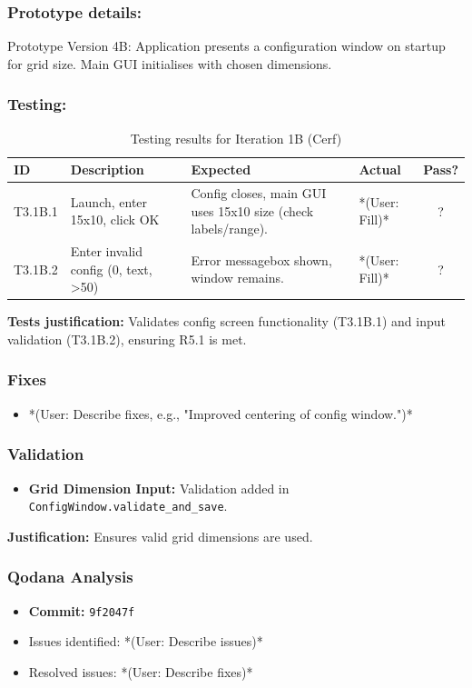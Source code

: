 \subsubsection{Prototype details:}
Prototype Version 4B: Application presents a configuration window on startup for grid size. Main GUI initialises with chosen dimensions.

\subsubsection{Testing:}
\begin{table}[htbp]
	\centering
	\begin{tabularx}{\textwidth}{|l|X|p{4.5cm}|p{1.5cm}|c|}
		\hline
		\textbf{ID} & \textbf{Description} & \textbf{Expected} & \textbf{Actual} & \textbf{Pass?} \\
		\hline
		T3.1B.1 & Launch, enter 15x10, click OK & Config closes, main GUI uses 15x10 size (check labels/range). & *(User: Fill)* & ? \\
		\hline
		T3.1B.2 & Enter invalid config (0, text, >50) & Error messagebox shown, window remains. & *(User: Fill)* & ? \\
		\hline
	\end{tabularx}
	\caption{Testing results for Iteration 1B (Cerf)}
\end{table}
\textbf{Tests justification:} Validates config screen functionality (T3.1B.1) and input validation (T3.1B.2), ensuring R5.1 is met.

\subsubsection{Fixes}
\begin{itemize}
	\item *(User: Describe fixes, e.g., "Improved centering of config window.")*
\end{itemize}

\subsubsection{Validation}
\begin{itemize}
	\item \textbf{Grid Dimension Input:} Validation added in \verb|ConfigWindow.validate_and_save|.
\end{itemize}
\textbf{Justification:} Ensures valid grid dimensions are used.

\subsubsection{Qodana Analysis}
\begin{itemize}
	\item \textbf{Commit:} \verb|9f2047f|
	\item Issues identified: *(User: Describe issues)*
	\item Resolved issues: *(User: Describe fixes)*
\end{itemize}

